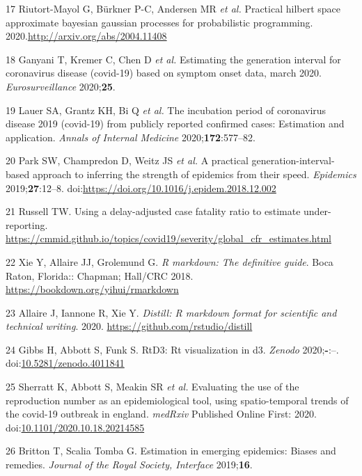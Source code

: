 \documentclass[
]{article}
\begin{document}
\leavevmode\hypertarget{ref-approxGP}{}%
17 Riutort-Mayol G, Bürkner P-C, Andersen MR \emph{et al.} Practical
hilbert space approximate bayesian gaussian processes for probabilistic
programming. 2020.\url{http://arxiv.org/abs/2004.11408}

\leavevmode\hypertarget{ref-generationinterval}{}%
18 Ganyani T, Kremer C, Chen D \emph{et al.} Estimating the generation
interval for coronavirus disease (covid-19) based on symptom onset data,
march 2020. \emph{Eurosurveillance} 2020;\textbf{25}.

\leavevmode\hypertarget{ref-incubationperiod}{}%
19 Lauer SA, Grantz KH, Bi Q \emph{et al.} The incubation period of
coronavirus disease 2019 (covid-19) from publicly reported confirmed
cases: Estimation and application. \emph{Annals of Internal Medicine}
2020;\textbf{172}:577--82.

\leavevmode\hypertarget{ref-Park2019}{}%
20 Park SW, Champredon D, Weitz JS \emph{et al.} A practical
generation-interval-based approach to inferring the strength of
epidemics from their speed. \emph{Epidemics} 2019;\textbf{27}:12--8.
doi:\href{https://doi.org/https://doi.org/10.1016/j.epidem.2018.12.002}{https://doi.org/10.1016/j.epidem.2018.12.002}

\leavevmode\hypertarget{ref-Russell:BFVkJ6lQ}{}%
21 Russell TW. Using a delay-adjusted case fatality ratio to estimate
under-reporting.
\url{https://cmmid.github.io/topics/covid19/severity/global_cfr_estimates.html}

\leavevmode\hypertarget{ref-rmarkdown}{}%
22 Xie Y, Allaire JJ, Grolemund G. \emph{R markdown: The definitive
guide}. Boca Raton, Florida:: Chapman; Hall/CRC 2018.
\url{https://bookdown.org/yihui/rmarkdown}

\leavevmode\hypertarget{ref-distill}{}%
23 Allaire J, Iannone R, Xie Y. \emph{Distill: R markdown format for
scientific and technical writing}. 2020.
\url{https://github.com/rstudio/distill}

\leavevmode\hypertarget{ref-rtd3}{}%
24 Gibbs H, Abbott S, Funk S. RtD3: Rt visualization in d3.
\emph{Zenodo} 2020;\textbf{-}:--.
doi:\href{https://doi.org/10.5281/zenodo.4011841}{10.5281/zenodo.4011841}

\leavevmode\hypertarget{ref-rt-comparison}{}%
25 Sherratt K, Abbott S, Meakin SR \emph{et al.} Evaluating the use of
the reproduction number as an epidemiological tool, using
spatio-temporal trends of the covid-19 outbreak in england.
\emph{medRxiv} Published Online First: 2020.
doi:\href{https://doi.org/10.1101/2020.10.18.20214585}{10.1101/2020.10.18.20214585}

\leavevmode\hypertarget{ref-Britton:2019gf}{}%
26 Britton T, Scalia Tomba G. Estimation in emerging epidemics: Biases
and remedies. \emph{Journal of the Royal Society, Interface}
2019;\textbf{16}.
\end{document}

